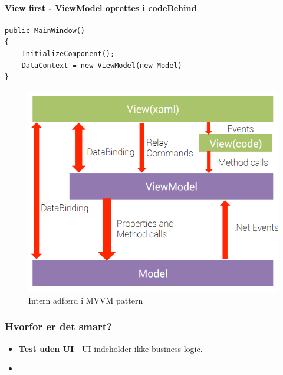 \paragraph{View first - ViewModel oprettes i codeBehind}

\begin{lstlisting}[caption=ViewModel oprettes i views codeBehind]
public MainWindow()
{
	InitializeComponent();
	DataContext = new ViewModel(new Model)
}
\end{lstlisting}


\begin{figure}[H]
\centering
\includegraphics[width=0.7\linewidth]{figs/MVVM/mvvmPatternComplex}
\caption{Intern adfærd i MVVM pattern}
\label{fig:mvvmPatternComplex}
\end{figure}

\subsubsection{Hvorfor er det smart?}

\begin{itemize}
	\item \textbf{Test uden UI} - UI indeholder ikke business logic.
	\item 
\end{itemize}





